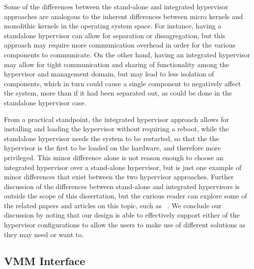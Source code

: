 Some of the differences between the stand-alone and integrated hypervisor approaches are analogous to the inherent differences between micro kernels and monolithic kernels in the operating system space. For instance, having a standalone hypervisor can allow for separation or dissagregation\cite{murray_2008}, but this approach may require more communication overhead in order for the various components to communicate. On the other hand, having an integrated hypervisor may allow for tight communication and sharing of functionality among the hypervisor and management domain, but may lead to less isolation of components, which in turn could cause a single component to negatively affect the system, more than if it had been separated out, as could be done in the standalone hypervisor case.

From a practical standpoint, the integrated hypervisor approach allows for installing and loading the hypervisor without requiring a reboot, while the standalone hypervisor needs the system to be restarted, so that the the hypervisor is the first to be loaded on the hardware, and therefore more privileged. This minor difference alone is not reason enough to choose an integrated hypervisor over a stand-alone hypervisor, but is just one example of minor differences that exist between the two hypervisor approaches. Further discussion of the differences between stand-alone and integrated hypervisors is outside the scope of this dissertation, but the curious reader can explore some of the related papers and articles on this topic, such as ~\cite{kvm_ols07, clark_2004, kvm_vs_xen_at_xen_summit_2008, redhat_rhel_54_2009, crosby_xen_dead_2008, cnet_hypervisor_2010, crosby_novell_2010, liguori_truth_2008,rhev_2009,qubes-os_2010}. We conclude our discussion by noting that our design is able to effectively support either of the hypervisor configurations to allow the users to make use of different solutions as they may need or want to.

\subsection{VMM Interface}
\label{sec:vmm-implementation}

